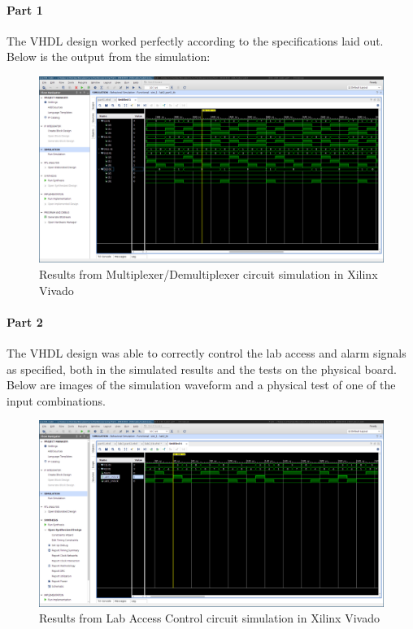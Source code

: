 \documentclass{article}
\begin{document}
    \paragraph{Part 1}
    The VHDL design worked perfectly according to the specifications laid out.
    Below is the output from the simulation:

    \begin{figure}[H]
        \includegraphics[width=\linewidth]{MUX_DEMUX.png}
        \caption{Results from Multiplexer/Demultiplexer circuit simulation in Xilinx Vivado}
        \label{fig:part1_sim}
    \end{figure}

    \paragraph{Part 2}
    The VHDL design was able to correctly control the lab access and alarm signals
    as specified, both in the simulated results and the tests on the physical board.
    Below are images of the simulation waveform and a physical test of one of the
    input combinations.

    \begin{figure}[H]
        \includegraphics[width=\linewidth]{Access_control.png}
        \caption{Results from Lab Access Control circuit simulation in Xilinx Vivado}
        \label{fig:part2_sim}
    \end{figure}
\end{document}
